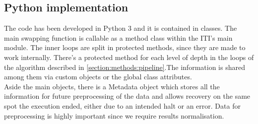 \subsection{Python implementation}
The code has been developed in Python 3 and it is contained in classes. The main swapping function is callable as a method class within the ITI's main module. The inner loops are split in protected methods, since they are made to work internally. There’s a protected method for each level of depth in the loops of the algorithm described in \ref{section:methods:pipeline}.The information is shared among them via custom objects or the global class attributes.
\\

Aside the main objects, there is a Metadata object which stores all the information for future preprocessing of the data and allows recovery on the same spot the execution ended, either due to an intended halt or an error.
Data for preprocessing is highly important since we require results normalisation.


